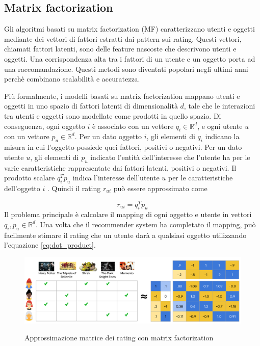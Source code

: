 \subsection{Matrix factorization} \label{ssec:mf}
Gli algoritmi basati su matrix factorization (MF) caratterizzano utenti e oggetti mediante dei vettori di fattori estratti dai pattern sui rating. Questi vettori, chiamati fattori latenti, sono delle feature nascoste che descrivono utenti e oggetti. Una corrispondenza alta tra i fattori di un utente e un oggetto porta ad una raccomandazione. Questi metodi sono diventati popolari negli ultimi anni perchè combinano scalabilità e accuratezza. %

Più formalmente, i modelli basati su matrix factorization mappano utenti e oggetti in uno spazio di fattori latenti di dimensionalità $d$, tale che le interazioni tra utenti e oggetti sono modellate come prodotti in quello spazio. Di conseguenza, ogni oggetto $i$ è associato con un vettore $q_i \in \mathbb{R}^d$, e ogni utente $u$ con un vettore $p_u \in \mathbb{R}^d$. Per un dato oggetto $i$, gli elementi di $q_i$ indicano la misura in cui l'oggetto possiede quei fattori, positivi o negativi. Per un dato utente $u$, gli elementi di $p_u$ indicato l'entità dell'interesse che l'utente ha per le varie caratteristiche rappresentate dai fattori latenti, positivi o negativi. Il prodotto scalare $q_i^Tp_u$ indica l'interesse dell'utente $u$ per le caratteristiche dell'oggetto $i$ \cite{matrix-factorization}. Quindi il rating $r_{ui}$ può essere approssimato come

\begin{equation} \label{eq:dot_product}
r_{ui} = q_i^Tp_u
\end{equation}
Il problema principale è calcolare il mapping di ogni oggetto e utente in vettori $q_i, p_u \in \mathbb{R}^d$. Una volta che il recommender system ha completato il mapping, può facilmente stimare il rating che un utente darà a qualsiasi oggetto utilizzando l'equazione \ref{eq:dot_product}. 

\begin{figure}
  \centering
  \includegraphics[width=\linewidth]{immagini/matrix_factorization.pdf}
  \caption{Approssimazione matrice dei rating con matrix factorization}
  \cite{mf-google}
  \label{fig:matrix_factorization}
\end{figure}

